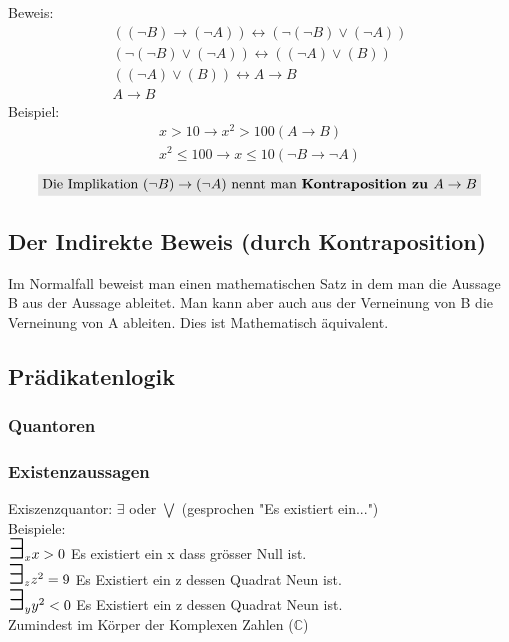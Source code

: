 \documentclass[a4paper]{scrartcl}
\newcommand\bigexists{\mbox{\huge $\exists$}}
\begin{document}
Beweis: 
\begin{align}
((\neg B) \rightarrow (\neg A)) \leftrightarrow (\neg (\neg B) \vee (\neg A)) \\
(\neg (\neg B) \vee (\neg A)) \leftrightarrow ((\neg A) \vee (B)) \\
((\neg A) \vee (B)) \leftrightarrow A \rightarrow B \\
A \rightarrow B  
\end{align}
Beispiel:
\begin{align}
x>10 \rightarrow x^2>100 (A \rightarrow B) \\
x^2\leqslant 100 \rightarrow x \leqslant 10 (\neg B \rightarrow \neg A)
\end{align}
\begin{align}
\colorbox{liteGray}{Die Implikation $(\neg B) \rightarrow (\neg A)$ nennt man \bf{Kontraposition} zu $A \rightarrow B$}
\end{align}

\subsection{Der Indirekte Beweis (durch Kontraposition)}
Im Normalfall beweist man einen mathematischen Satz in dem man die Aussage B aus der Aussage ableitet. Man kann aber auch aus der Verneinung von B die Verneinung von A ableiten. Dies ist Mathematisch äquivalent.

\subsection{Prädikatenlogik}

\subsubsection{Quantoren}

\subsubsection{Existenzaussagen}
Exiszenzquantor: $\exists$ oder $\bigvee$ (gesprochen "Es existiert ein...")\\
Beispiele: \\
$\bigexists_x x > 0$ Es existiert ein x dass grösser Null ist. \\
$\bigexists_z z^2 = 9 $ Es Existiert ein z dessen Quadrat Neun ist.\\
$\bigexists_y y^2 < 0 $ Es Existiert ein z dessen Quadrat Neun ist. \\ Zumindest im Körper der Komplexen Zahlen ($\mathbb{C}$) \\
\end{document}

